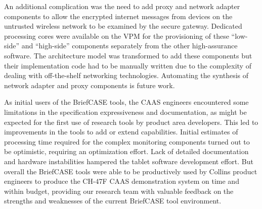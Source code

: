 
An additional complication was the need to add proxy and network adapter components to 
allow the encrypted internet messages from devices on the untrusted wireless network to be examined by the 
secure gateway.  Dedicated processing cores were available on the VPM for the provisioning of these ``low-side'' and ``high-side''
components separately from the other high-assurance software.  The architecture model was transformed to add these 
components but their implementation code had to be manually written due to the complexity of dealing with
off-the-shelf networking technologies.  Automating the synthesis of network adapter and proxy components
is future work.

As initial users of the BriefCASE tools, the CAAS engineers encountered some limitations in the
specification expressiveness and documentation, as might be
expected for the first use of research tools by product area developers. 
This led to improvements in the tools to add or extend capabilities.  Initial estimates of
processing time required for the complex monitoring components turned out to be optimistic,
requiring an optimization effort. Lack of detailed documentation and hardware instabilities 
hampered the tablet software development effort. But overall the BriefCASE tools were able
to be productively used by Collins product engineers to produce the CH-47F CAAS demonstration
system on time and within budget, providing our research team with valuable feedback on the
strengths and weaknesses of the current BriefCASE tool environment.
